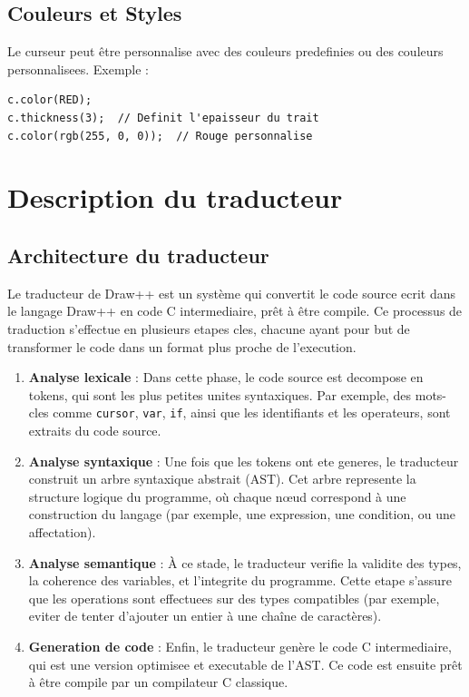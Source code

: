 \documentclass[12pt,a4paper]{report}
\begin{document}
\section{Couleurs et Styles}
Le curseur peut être personnalise avec des couleurs predefinies ou des couleurs personnalisees. Exemple :
\begin{lstlisting}[language=Draw++]
c.color(RED);
c.thickness(3);  // Definit l'epaisseur du trait
c.color(rgb(255, 0, 0));  // Rouge personnalise
\end{lstlisting}



\chapter{Description du traducteur}

\section{Architecture du traducteur}
Le traducteur de Draw++ est un système qui convertit le code source ecrit dans le langage Draw++ en code C intermediaire, prêt à être compile. Ce processus de traduction s'effectue en plusieurs etapes cles, chacune ayant pour but de transformer le code dans un format plus proche de l'execution.

\begin{enumerate}
    \item \textbf{Analyse lexicale} : Dans cette phase, le code source est decompose en tokens, qui sont les plus petites unites syntaxiques. Par exemple, des mots-cles comme \texttt{cursor}, \texttt{var}, \texttt{if}, ainsi que les identifiants et les operateurs, sont extraits du code source.
    \item \textbf{Analyse syntaxique} : Une fois que les tokens ont ete generes, le traducteur construit un arbre syntaxique abstrait (AST). Cet arbre represente la structure logique du programme, où chaque nœud correspond à une construction du langage (par exemple, une expression, une condition, ou une affectation).
    \item \textbf{Analyse semantique} : À ce stade, le traducteur verifie la validite des types, la coherence des variables, et l'integrite du programme. Cette etape s'assure que les operations sont effectuees sur des types compatibles (par exemple, eviter de tenter d'ajouter un entier à une chaîne de caractères).
    \item \textbf{Generation de code} : Enfin, le traducteur genère le code C intermediaire, qui est une version optimisee et executable de l'AST. Ce code est ensuite prêt à être compile par un compilateur C classique.
\end{enumerate}
\end{document}
